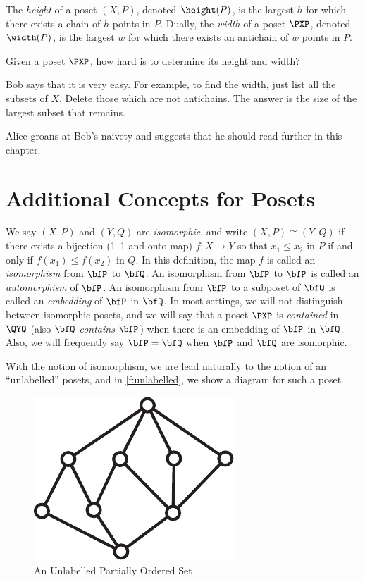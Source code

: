The \textit{height} of a poset
$(X,P)$, denoted $\height(P)$, is the largest $h$ for which there exists
a chain of $h$ points in $P$.
Dually, the \textit{width} of a poset $\PXP$, denoted $\width(P)$, is the
largest $w$ for which there exists an antichain of $w$ points in
$P$. 

\begin{question}
Given a poset $\PXP$, how hard is to determine its height and width?
\end{question}

Bob says that it is very easy.  For example, to find the width, just 
list all the subsets of $X$.  Delete those which are not antichains.
The answer is the size of the largest subset that remains.

Alice groans at Bob's naivety and suggests that he should read
further in this chapter.

\section{Additional Concepts for Posets}

We say $(X,P)$ and $(Y,Q)$ are \textit{isomorphic}, and write $(X,P)
\cong(Y,Q)$ if there exists a bijection (1--1 and
onto map) $f:X\to Y$ so that $x_1\le x_2$ in $P$ if and only if
$f(x_1)\le f(x_2)$ in $Q$. In this definition, the map $f$ is called an
\textit{isomorphism} from $\bfP$ to $\bfQ$. An isomorphism from $\bfP$ to 
$\bfP$ is called an \textit{automorphism} of $\bfP$. An isomorphism from 
$\bfP$ to a subposet of $\bfQ$ is called an \textit{embedding} of
$\bfP$ in $\bfQ$. In most settings, we will not distinguish between
isomorphic posets, and we will say that a poset $\PXP$ is \textit{contained}
in $\QYQ$ (also $\bfQ$ \textit{contains} $\bfP$) when there is an
embedding of $\bfP$ in $\bfQ$. Also, we will frequently say $\bfP=\bfQ$
when $\bfP$ and $\bfQ$ are isomorphic.

With the notion of isomorphism, we are lead naturally to the notion of
an ``unlabelled'' posets, and in \autoref{f:unlabelled}, we show a
diagram for such a poset.

\begin{figure}[hb]
\begin{center}
\includegraphics*[scale=.4]{posets-figs/wttfig-5.pdf}
\caption{\label{f:unlabelled}\sc An Unlabelled Partially Ordered Set}
\end{center}
\end{figure}


